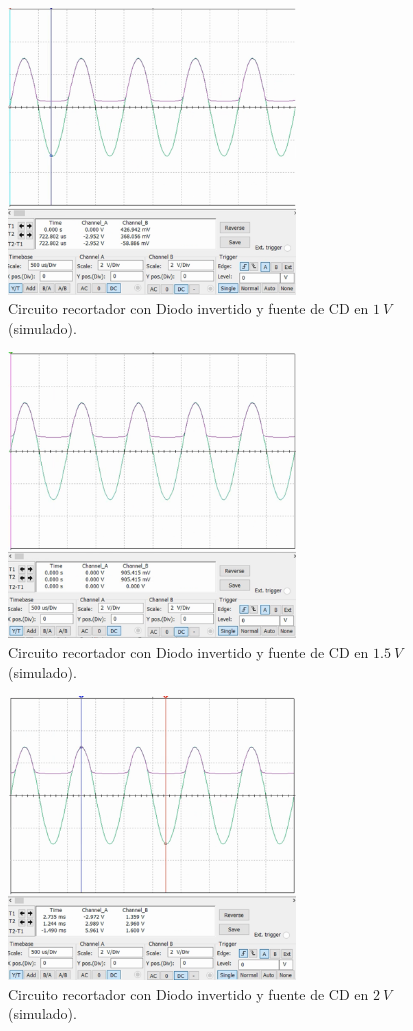 \documentclass[journal]{IEEEtran}
\begin{document}
\begin{figure}[H]
        \centering
        \includegraphics[width=3in]{SignalSimulated_12.png}
        \caption{Circuito recortador con Diodo invertido y fuente de CD en $1~V$ (simulado).}
        \label{fig:SignalSimulated_12}
\end{figure}
\begin{figure}[H]
        \centering
        \includegraphics[width=3in]{SignalSimulated_13.png}
        \caption{Circuito recortador con Diodo invertido y fuente de CD en $1.5~V$ (simulado).}
        \label{fig:SignalSimulated_13}
\end{figure}
\begin{figure}[H]
        \centering
        \includegraphics[width=3in]{SignalSimulated_14.png}
        \caption{Circuito recortador con Diodo invertido y fuente de CD en $2~V$ (simulado).}
        \label{fig:SignalSimulated_14}
\end{figure}
\end{document}
